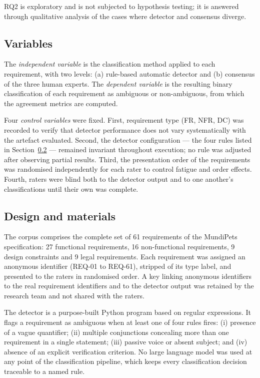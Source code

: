 \documentclass[pdflatex,sn-mathphys-num]{sn-jnl}
\theoremstyle{thmstyleone}%
\theoremstyle{thmstyletwo}%
\theoremstyle{thmstylethree}%
\begin{document}
	RQ2 is exploratory and is not subjected to hypothesis testing; it is answered
	through qualitative analysis of the cases where detector and consensus diverge.
	
	\subsection{Variables}\label{subsec:variables}
	
	The \emph{independent variable} is the classification method applied to each
	requirement, with two levels: (a) rule-based automatic detector and (b) consensus
	of the three human experts. The \emph{dependent variable} is the resulting
	binary classification of each requirement as ambiguous or non-ambiguous, from
	which the agreement metrics are computed.
	
	Four \emph{control variables} were fixed. First, requirement type (FR, NFR, DC)
	was recorded to verify that detector performance does not vary systematically
	with the artefact evaluated. Second, the detector configuration --- the four
	rules listed in Section~\ref{subsec:design} --- remained invariant throughout
	execution; no rule was adjusted after observing partial results. Third, the
	presentation order of the requirements was randomised independently for each
	rater to control fatigue and order effects. Fourth, raters were blind both to
	the detector output and to one another's classifications until their own was
	complete.
	
	\subsection{Design and materials}\label{subsec:design}
	
	The corpus comprises the complete set of 61 requirements of the MundiPets
	specification: 27 functional requirements, 16 non-functional requirements, 9
	design constraints and 9 legal requirements. Each requirement was assigned an
	anonymous identifier (REQ-01 to REQ-61), stripped of its type label, and
	presented to the raters in randomised order. A key linking anonymous
	identifiers to the real requirement identifiers and to the detector output was
	retained by the research team and not shared with the raters.
	
	The detector is a purpose-built Python program based on regular expressions. It
	flags a requirement as ambiguous when at least one of four rules fires:
	(i) presence of a vague quantifier; (ii) multiple conjunctions concealing more
	than one requirement in a single statement; (iii) passive voice or absent
	subject; and (iv) absence of an explicit verification criterion. No large
	language model was used at any point of the classification pipeline, which keeps
	every classification decision traceable to a named rule.
	
\end{document}
